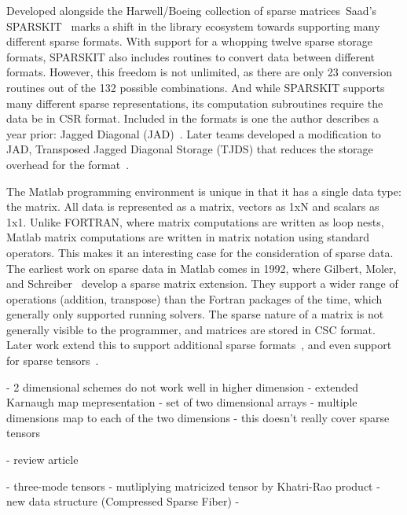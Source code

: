 Developed alongside the Harwell/Boeing collection of sparse matrices~\cite{duff1989sparse}Saad's SPARSKIT~\cite{saad1990sparskit} marks a shift in the library ecosystem towards supporting many different sparse formats. 
With support for a whopping twelve sparse storage formats, SPARSKIT also includes routines to convert data between different formats. 
However, this freedom is not unlimited, as there are only 23 conversion routines out of the 132 possible combinations. 
And while SPARSKIT supports many different sparse representations, its computation subroutines require the data be in CSR format. 
Included in the formats is one the author describes a year prior: Jagged Diagonal (JAD)~\cite{saad1989krylov}.
Later teams developed a modification to JAD, Transposed Jagged Diagonal Storage (TJDS) that reduces the storage overhead for the format~\cite{montagne2004optimal}.


The Matlab programming environment is unique in that it has a single data type: the matrix. 
All data is represented as a matrix, vectors as 1xN and scalars as 1x1.
Unlike FORTRAN, where matrix computations are written as loop nests, Matlab matrix computations are written in matrix notation using standard operators.
This makes it an interesting case for the consideration of sparse data.
The earliest work on sparse data in Matlab comes in 1992, where Gilbert, Moler, and Schreiber~\cite{gilbert1992sparse} develop a sparse matrix extension.
They support a wider range of operations (addition, transpose) than the Fortran packages of the time, which generally only supported running solvers. 
The sparse nature of a matrix is not generally visible to the programmer, and matrices are stored in CSC format.
Later work extend this to support additional sparse formats~\cite{kawabata2004matlab}, and even support for sparse tensors~\cite{bader2008efficient}.




\cite{lin2002efficient}
- 2 dimensional schemes do not work well in higher dimension
- extended Karnaugh map mepresentation
- set of two dimensional arrays
- multiple dimensions map to each of the two dimensions
- this doesn't really cover sparse tensors

\cite{kolda2008scalable}

\cite{kolda2009tensor}
- review article

\cite{smith2015splatt}
- three-mode tensors
- mutliplying matricized tensor by Khatri-Rao product
- new data structure (Compressed Sparse Fiber)
-  



